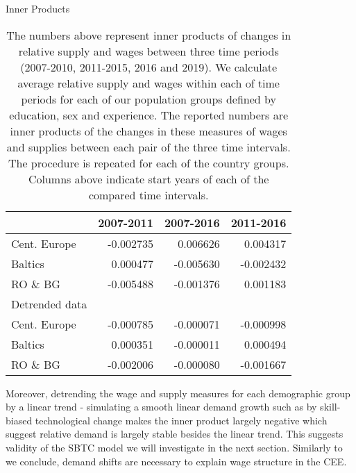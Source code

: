 \documentclass[11pt]{article}
\begin{document}
\begin{table}[!htbp]
\centering 
\caption{Inner Products}
\label{inner_products_ls_w}
\begin{center}

\begin{tabular}{lrrr}
\toprule
{} &  2007-2011 &  2007-2016 &  2011-2016 \\
\midrule

Cent. Europe &  -0.002735 &   0.006626 &   0.004317 \\
Baltics   &   0.000477 &  -0.005630 &  -0.002432 \\
RO \& BG   &  -0.005488 &  -0.001376 &   0.001183 \\
\midrule
Detrended data\\
\midrule
Cent. Europe &  -0.000785 &  -0.000071 &  -0.000998 \\
Baltics   &   0.000351 &  -0.000011 &   0.000494 \\
RO \& BG   &  -0.002006 &  -0.000080 &  -0.001667 \\
\bottomrule
\end{tabular}
\caption*{\footnotesize  The numbers above represent inner products of changes in relative supply and wages between three time periods (2007-2010, 2011-2015, 2016 and 2019). We calculate average relative supply and wages within each of time periods for each of our population groups defined by education, sex and experience. The reported numbers are inner products of the changes in these measures of wages and supplies between each pair of the three time intervals. The procedure is repeated for each of the country groups. Columns above indicate start years of each of the compared time intervals.}
\end{center}
\end{table}

Moreover, detrending the wage and supply measures for each demographic group by a linear trend  - simulating a smooth linear demand growth such as by skill-biased technological change makes the inner product largely negative which suggest relative demand is largely stable besides the linear trend. This suggests validity of the SBTC model we will investigate in the next section.
Similarly to \citeauthor{katz1992changes} we conclude, demand shifts are necessary to explain wage structure in the CEE.


\end{document}
